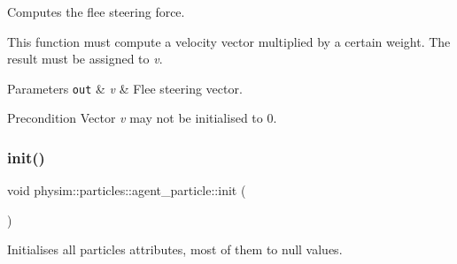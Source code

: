 Computes the flee steering force. 

This function must compute a velocity vector multiplied by a certain weight. The result must be assigned to {\itshape v}.


\begin{DoxyParams}[1]{Parameters}
\mbox{\tt out}  & {\em v} & Flee steering vector. \\
\hline
\end{DoxyParams}
\begin{DoxyPrecond}{Precondition}
Vector {\itshape v} may not be initialised to 0. 
\end{DoxyPrecond}
\mbox{\label{classphysim_1_1particles_1_1agent__particle_ac13082909f480fc55d406321c77d38b1}} 
\subsubsection{\texorpdfstring{init()}{init()}}
{\footnotesize\ttfamily void physim\+::particles\+::agent\+\_\+particle\+::init (\begin{DoxyParamCaption}{ }\end{DoxyParamCaption})\hspace{0.3cm}{\ttfamily [virtual]}}



Initialises all particle\textquotesingle{}s attributes, most of them to null values. 

